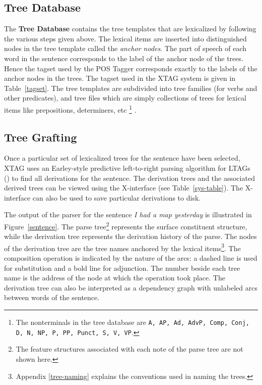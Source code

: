 \subsection{Tree Database}
\label{tree-db}

The {\bf Tree Database} contains the tree templates that are
lexicalized by following the various steps given above. The lexical
items are inserted into distinguished nodes in the tree template
called the {\em anchor nodes}.  The part of speech of each word in the
sentence corresponds to the label of the anchor node of the trees.
Hence the tagset used by the POS Tagger corresponds exactly to the
labels of the anchor nodes in the trees.  The tagset used in the XTAG
system is given in Table~\ref{tagset}. The tree templates are
subdivided into tree families (for verbs and other predicates), and
tree files which are simply collections of trees for lexical items
like prepositions, determiners, etc%
\footnote{ The nonterminals in the tree database are {\tt A, AP, Ad,
    AdvP, Comp, Conj, D, N, NP, P, PP, Punct, S, V, VP}.}%
.

\subsection{Tree Grafting}

Once a particular set of lexicalized trees for the sentence have been
selected, XTAG uses an Earley-style predictive left-to-right parsing
algorithm for LTAGs (\cite{schabesjoshi88,schabes90}) to find all
derivations for the sentence. The derivation trees and the associated
derived trees can be viewed using the X-interface (see
Table~\ref{sys-table}). The X-interface can also be used to save
particular derivations to disk.

The output of the parser for the sentence {\it I had a map yesterday} is
illustrated in Figure~\ref{sentence}. The parse tree\footnote{The feature
structures associated with each note of the parse tree are not shown here.}
represents the surface constituent structure, while the derivation tree
represents the derivation history of the parse. The nodes of the derivation
tree are the tree names anchored by the lexical items\footnote{Appendix
\ref{tree-naming} explains the conventions used in naming the trees.}.  The
composition operation is indicated by the nature of the arcs: a dashed line is
used for substitution and a bold line for adjunction.  The number beside each
tree name is the address of the node at which the operation took place.  The
derivation tree can also be interpreted as a dependency graph with unlabeled
arcs between words of the sentence.

